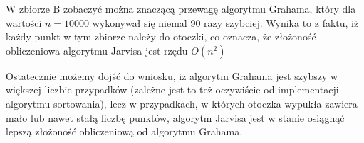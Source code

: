 \documentclass[11pt,a4paper]{article}
\begin{document}
W zbiorze B zobaczyć można znaczącą przewagę algorytmu Grahama, który
dla wartości $n = 10000$ wykonywał się niemal 90 razy szybciej. 
Wynika to z faktu, iż każdy punkt w tym zbiorze należy do otoczki, co
oznacza, że złożoność obliczeniowa algorytmu Jarvisa jest rzędu $O(n^2)$

Ostatecznie możemy dojść do wniosku, iż algorytm Grahama jest szybszy
w większej liczbie przypadków (zależne jest to też oczywiście od implementacji
algorytmu sortowania), lecz w przypadkach, w których otoczka wypukła zawiera
mało lub nawet stałą liczbę punktów, algorytm Jarvisa jest w stanie osiągnąć
lepszą złożoność obliczeniową od algorytmu Grahama.
\end{document}
